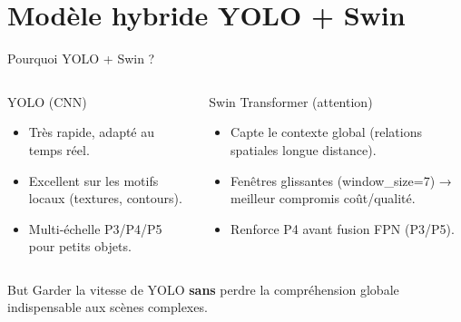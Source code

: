 \documentclass[aspectratio=169,11pt]{beamer}
\begin{document}
\section{Modèle hybride YOLO + Swin}

\begin{frame}{Pourquoi YOLO + Swin ?}
  \begin{columns}[T,onlytextwidth]
    \begin{block}{YOLO (CNN)}
      \begin{itemize}
        \item Très rapide, adapté au temps réel.
        \item Excellent sur les motifs locaux (textures, contours).
        \item Multi-échelle P3/P4/P5 pour petits objets.
      \end{itemize}
    \end{block}

    \begin{block}{Swin Transformer (attention)}
      \begin{itemize}
        \item Capte le contexte global (relations spatiales longue distance).
        \item Fenêtres glissantes (window\_size=7) → meilleur compromis coût/qualité.
        \item Renforce P4 avant fusion FPN (P3/P5).
      \end{itemize}
    \end{block}
  \end{columns}

  \vspace{0.2cm}
  \begin{alertblock}{But}
    Garder la vitesse de YOLO \textbf{sans} perdre la compréhension globale indispensable aux scènes complexes.
  \end{alertblock}
\end{frame}
\end{document}
